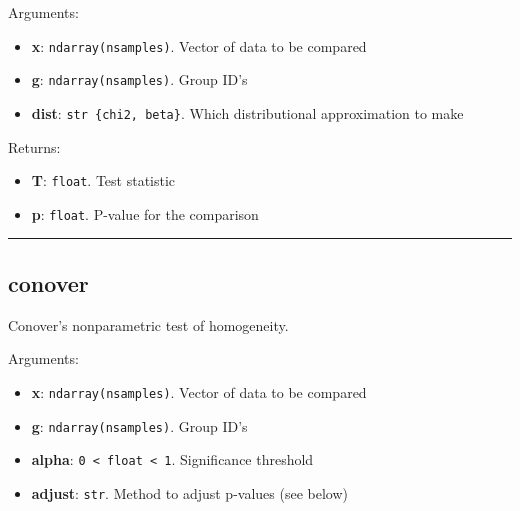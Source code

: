 Arguments:

\begin{itemize}
\tightlist
\item
  \textbf{x}: \texttt{ndarray(nsamples)}. Vector of data to be compared
\item
  \textbf{g}: \texttt{ndarray(nsamples)}. Group ID's
\item
  \textbf{dist}:
  \texttt{str\ \{\textquotesingle{}chi2\textquotesingle{},\ \textquotesingle{}beta\textquotesingle{}\}}.
  Which distributional approximation to make
\end{itemize}

Returns:

\begin{itemize}
\tightlist
\item
  \textbf{T}: \texttt{float}. Test statistic
\item
  \textbf{p}: \texttt{float}. P-value for the comparison
\end{itemize}

\begin{center}\rule{0.5\linewidth}{\linethickness}\end{center}

\subsection{conover}\label{conover}

\begin{Shaded}
\begin{Highlighting}[]
\OperatorTok{=}\OperatorTok{=}\NormalTok{)}
\end{Highlighting}
\end{Shaded}

Conover's nonparametric test of homogeneity.

Arguments:

\begin{itemize}
\tightlist
\item
  \textbf{x}: \texttt{ndarray(nsamples)}. Vector of data to be compared
\item
  \textbf{g}: \texttt{ndarray(nsamples)}. Group ID's
\item
  \textbf{alpha}: \texttt{0\ \textless{}\ float\ \textless{}\ 1}.
  Significance threshold
\item
  \textbf{adjust}: \texttt{str}. Method to adjust p-values (see below)
\end{itemize}

